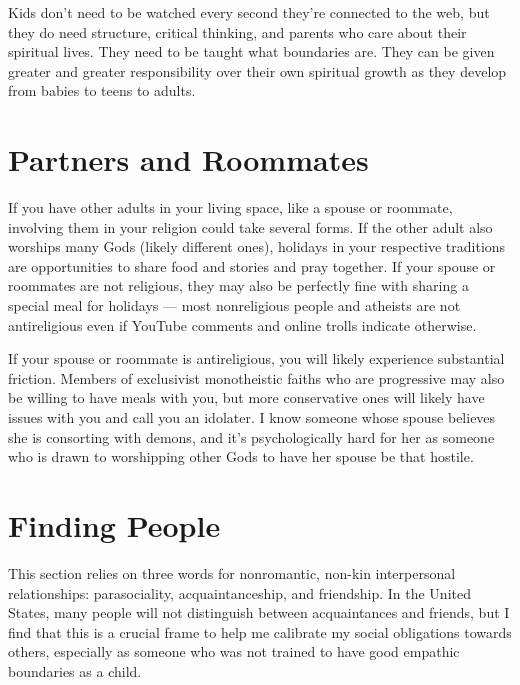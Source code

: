 \documentclass[
]{book}
\begin{document}
Kids don't need to be watched every second they're connected to the web, but they do need structure, critical thinking, and parents who care about their spiritual lives. They need to be taught what boundaries are. They can be given greater and greater responsibility over their own spiritual growth as they develop from babies to teens to adults.

\hypertarget{partners-and-roommates}{%
\section{Partners and Roommates}\label{partners-and-roommates}}

If you have other adults in your living space, like a spouse or roommate, involving them in your religion could take several forms. If the other adult also worships many Gods (likely different ones), holidays in your respective traditions are opportunities to share food and stories and pray together. If your spouse or roommates are not religious, they may also be perfectly fine with sharing a special meal for holidays --- most nonreligious people and atheists are not antireligious even if YouTube comments and online trolls indicate otherwise.

If your spouse or roommate is antireligious, you will likely experience substantial friction. Members of exclusivist monotheistic faiths who are progressive may also be willing to have meals with you, but more conservative ones will likely have issues with you and call you an idolater. I know someone whose spouse believes she is consorting with demons, and it's psychologically hard for her as someone who is drawn to worshipping other Gods to have her spouse be that hostile.

\hypertarget{finding-people}{%
\section{Finding People}\label{finding-people}}

This section relies on three words for nonromantic, non-kin interpersonal relationships: parasociality, acquaintanceship, and friendship. In the United States, many people will not distinguish between acquaintances and friends, but I find that this is a crucial frame to help me calibrate my social obligations towards others, especially as someone who was not trained to have good empathic boundaries as a child.
\end{document}

